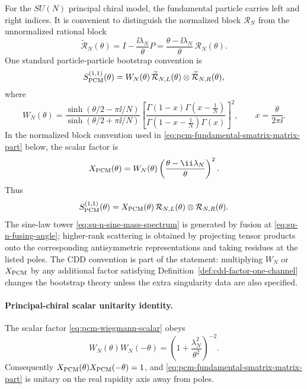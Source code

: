 For the \(SU(N)\) principal chiral model, the fundamental particle carries
left and right indices.  It is convenient to distinguish the normalized block
\(\mathcal R_N\) from the unnormalized rational block
\[
  \widetilde{\mathcal R}_N(\theta)
  =
  I-\frac{\ii\lambda_N}{\theta}P
  =
  \frac{\theta-\ii\lambda_N}{\theta}\,\mathcal R_N(\theta).
\]
One standard particle-particle bootstrap convention is
\begin{equation}
  S_{\rm PCM}^{(1,1)}(\theta)
  =
  W_N(\theta)\,
  \widetilde{\mathcal R}_{N,L}(\theta)\otimes
  \widetilde{\mathcal R}_{N,R}(\theta),
  \label{eq:pcm-fundamental-smatrix-unnormalized}
\end{equation}
where
\begin{equation}
  W_N(\theta)
  =
  \frac{\sinh(\theta/2-\pi\ii/N)}
       {\sinh(\theta/2+\pi\ii/N)}
  \left[
  \frac{\Gamma(1-x)\Gamma(x-\frac1N)}
       {\Gamma(1-x-\frac1N)\Gamma(x)}
  \right]^2,
  \qquad x=\frac{\theta}{2\pi\ii}.
  \label{eq:pcm-wiegmann-scalar}
\end{equation}
In the normalized block convention used in
\eqref{eq:pcm-fundamental-smatrix-matrix-part} below, the scalar factor is
\begin{equation}
  X_{\rm PCM}(\theta)
  =
  W_N(\theta)\left(\frac{\theta-\ii\lambda_N}{\theta}\right)^2.
  \label{eq:pcm-normalized-scalar}
\end{equation}
Thus
\begin{equation}
  S_{\rm PCM}^{(1,1)}(\theta)
  =
  X_{\rm PCM}(\theta)\,
  \mathcal R_{N,L}(\theta)\otimes\mathcal R_{N,R}(\theta).
  \label{eq:pcm-fundamental-smatrix-matrix-part}
\end{equation}
The sine-law tower \eqref{eq:su-n-sine-mass-spectrum} is generated by fusion
at \eqref{eq:su-n-fusing-angle}; higher-rank scattering is obtained by
projecting tensor products onto the corresponding antisymmetric
representations and taking residues at the listed poles.  The CDD convention
is part of the statement: multiplying \(W_N\) or \(X_{\rm PCM}\) by any
additional factor satisfying Definition~\ref{def:cdd-factor-one-channel}
changes the bootstrap theory unless the extra singularity data are also
specified.

\paragraph{Principal-chiral scalar unitarity identity.}
The scalar factor \eqref{eq:pcm-wiegmann-scalar} obeys
\begin{equation}
  W_N(\theta)W_N(-\theta)
  =
  \left(1+\frac{\lambda_N^2}{\theta^2}\right)^{-2}.
  \label{eq:pcm-wiegmann-unitarity-identity}
\end{equation}
Consequently \(X_{\rm PCM}(\theta)X_{\rm PCM}(-\theta)=1\), and
\eqref{eq:pcm-fundamental-smatrix-matrix-part} is unitary on the real
rapidity axis away from poles.

